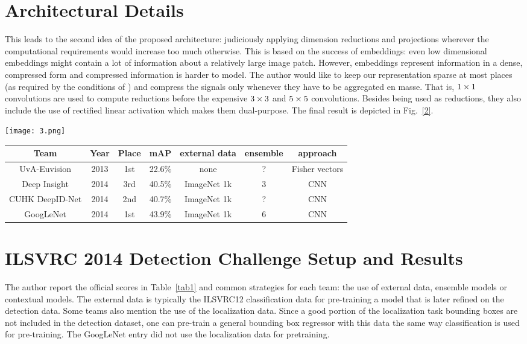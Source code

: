\documentclass[10pt,twocolumn,letterpaper]{article}
\begin{document}
\section{Architectural Details}
This leads to the second idea of the proposed architecture:  judiciously applying dimension reductions and projections wherever the computational requirements would increase too much otherwise. This is based on the success of embeddings: even low dimensional embeddings might contain a lot of information about a relatively large image patch. However, embeddings represent information in a dense, compressed form and compressed information is harder to model. The author would like to keep
our representation sparse at most places (as required by the conditions of \cite{3}) and compress the signals only whenever they have to be aggregated en masse. That is, ${\rm 1\times 1}$ convolutions are used to compute reductions before the expensive ${\rm 3\times 3}$ and
${\rm 5\times 5}$ convolutions. Besides being used as reductions, they also include the use of rectified linear activation which makes them dual-purpose. The final result is depicted in Fig.~\ref{2}.
\begin{figure*}
\begin{center}
  \texttt{[image: 3.png]}\\
  \caption{nception module.}\label{2}
\end{center}
\end{figure*}

\begin{table*}
\small
\renewcommand\arraystretch{1.2}
\centering
\begin{tabular}{|c|c|c|c|c|c|c|}
\hline
Team & Year & Place & mAP & external data & ensemble & approach \\
\hline
UvA-Euvision & 2013 & 1st & 22.6\% & none & ? & Fisher vectors \\
\hline
Deep Insight & 2014 & 3rd & 40.5\% & ImageNet 1k & 3 & CNN \\
\hline
CUHK DeepID-Net & 2014 & 2nd & 40.7\% & ImageNet 1k & ? & CNN \\
\hline
GoogLeNet & 2014 & 1st & 43.9\% & ImageNet 1k & 6 & CNN \\
\hline
\end{tabular} 
\caption{Detection performance.} \label{tab1}
\end{table*}
\section{ILSVRC 2014 Detection Challenge Setup and Results}
The author report the official scores in Table~\ref{tab1} and common strategies for each team: the use of external data, ensemble models or contextual models. The external data is typically the ILSVRC12 classification data for pre-training a model that is later refined on the detection data. Some teams also mention the use of the localization data. Since a good portion of the localization task bounding boxes are not included in the detection dataset, one can pre-train a general bounding box regressor with this data the same way classification is used for pre-training. The GoogLeNet entry did not use the localization data for pretraining.


{\small


}
\end{document}
